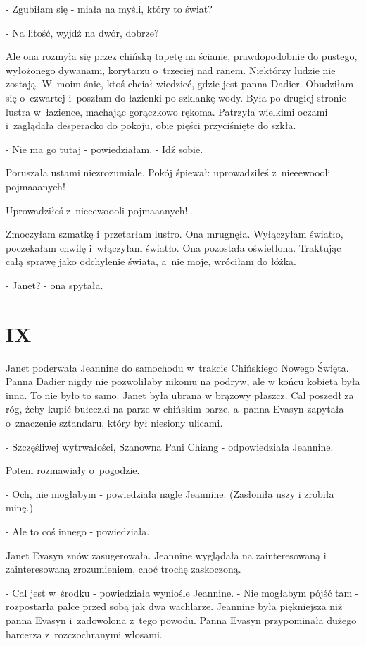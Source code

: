 \documentclass[oneside,polish,12pt,sfheadings]{mwbk}
\begin{document}
- Zgubiłam się - miała na myśli, który to świat?

- Na litość, wyjdź na dwór, dobrze?

Ale ona rozmyła się przez chińską tapetę na ścianie, prawdopodobnie
do pustego, wyłożonego dywanami, korytarzu o~trzeciej nad ranem. Niektórzy
ludzie nie zostają. W~moim śnie, ktoś chciał wiedzieć, gdzie jest
panna Dadier. Obudziłam się o~czwartej i~poszłam do łazienki po szklankę
wody. Była po drugiej stronie lustra w~łazience, machając gorączkowo
rękoma. Patrzyła wielkimi oczami i~zaglądała desperacko do pokoju,
obie pięści przyciśnięte do szkła.

- Nie ma go tutaj - powiedziałam. - Idź sobie.

Poruszała ustami niezrozumiale. Pokój śpiewał: uprowadziłeś z~nieeewoooli
pojmaaanych!

Uprowadziłeś z~nieeewoooli pojmaaanych!

Zmoczyłam szmatkę i~przetarłam lustro. Ona mrugnęła. Wyłączyłam światło,
poczekałam chwilę i~włączyłam światło. Ona pozostała oświetlona. Traktując
całą sprawę jako odchylenie świata, a~nie moje, wróciłam do łóżka.

- Janet? - ona spytała.

\chapter{IX}

Janet poderwała Jeannine do samochodu w~trakcie Chińskiego Nowego
Święta. Panna Dadier nigdy nie pozwoliłaby nikomu na podryw, ale w
końcu kobieta była inna. To nie było to samo. Janet była ubrana w
brązowy płaszcz. Cal poszedł za róg, żeby kupić bułeczki na parze
w chińskim barze, a~panna Evasyn zapytała o~znaczenie sztandaru, który
był niesiony ulicami.

- Szczęśliwej wytrwałości, Szanowna Pani Chiang - odpowiedziała Jeannine.

Potem rozmawiały o~pogodzie.

- Och, nie mogłabym - powiedziała nagle Jeannine. (Zasłoniła uszy
i zrobiła minę.) 

- Ale to coś innego - powiedziała.

Janet Evasyn znów zasugerowała. Jeannine wyglądała na zainteresowaną
i zainteresowaną zrozumieniem, choć trochę zaskoczoną.

- Cal jest w~środku - powiedziała wyniośle Jeannine. - Nie mogłabym
pójść tam - rozpostarła palce przed sobą jak dwa wachlarze. Jeannine
była piękniejsza niż panna Evasyn i~zadowolona z~tego powodu. Panna
Evasyn przypominała dużego harcerza z~rozczochranymi włosami.
\end{document}
